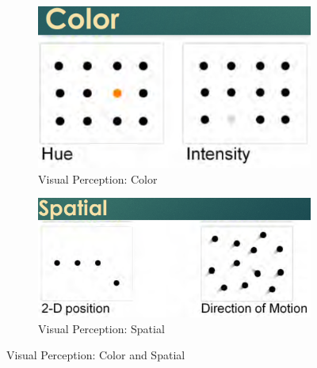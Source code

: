 \documentclass[11pt,fleqn]{book} %
\begin{document}
\begin{figure}[htb!]
    \centering
    \begin{subfigure}[c]{0.45\linewidth}
        \includegraphics[width=\linewidth]{Pictures/visual-perception-color.png}
        \caption{Visual Perception: Color}
        \label{fig:color}
    \end{subfigure}
    \hfill
    \begin{subfigure}[c]{0.45\linewidth}
        \includegraphics[width=\linewidth]{Pictures/visual-perception-spatial.png}
        \caption{Visual Perception: Spatial}
        \label{fig:spatial}
    \end{subfigure}
    \caption{Visual Perception: Color and Spatial}
    \label{fig:visual-perception-color-spatial}
\end{figure}
\end{document}

